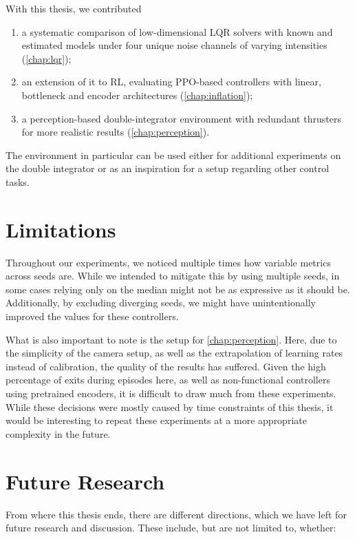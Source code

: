 With this thesis, we contributed

\begin{enumerate}
	\item a systematic comparison of low-dimensional LQR solvers with known and estimated models under four unique noise channels of varying intensities (\cref{chap:lqr});
	\item an extension of it to RL, evaluating PPO-based controllers with linear, bottleneck and encoder architectures (\cref{chap:inflation});
	\item a perception-based double-integrator environment with redundant thrusters for more realistic results (\cref{chap:perception}).
\end{enumerate}

The environment in particular can be used either for additional experiments on the double integrator
or as an inspiration for a setup regarding other control tasks.

\section{Limitations}
\label{sec:limitations}

Throughout our experiments, we noticed multiple times how variable metrics across seeds are. While we intended to mitigate
this by using multiple seeds, in some cases relying only on the median might not be as expressive as it should be. Additionally,
by excluding diverging seeds, we might have unintentionally improved the values for these controllers.

What is also important to note is the setup for \cref{chap:perception}. Here, due to the simplicity of the camera setup, as well as
the extrapolation of learning rates instead of calibration, the quality of the results has suffered. Given the high percentage of
exits during episodes here, as well as non-functional controllers using pretrained encoders, it is difficult to draw much from these
experiments. While these decisions were mostly caused by time constraints of this thesis, it would be interesting to repeat these experiments
at a more appropriate complexity in the future.

\section{Future Research}
\label{sec:future-research}

From where this thesis ends, there are different directions, which we have left for future research
and discussion. These include, but are not limited to, whether:

